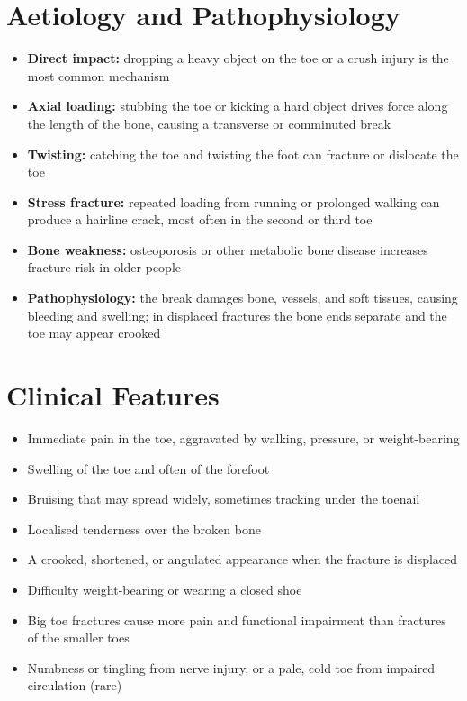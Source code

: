 \section*{Aetiology and Pathophysiology}
\begin{itemize}
    \item \textbf{Direct impact:} dropping a heavy object on the toe or a crush injury is the most common mechanism
    \item \textbf{Axial loading:} stubbing the toe or kicking a hard object drives force along the length of the bone, causing a transverse or comminuted break
    \item \textbf{Twisting:} catching the toe and twisting the foot can fracture or dislocate the toe
    \item \textbf{Stress fracture:} repeated loading from running or prolonged walking can produce a hairline crack, most often in the second or third toe
    \item \textbf{Bone weakness:} osteoporosis or other metabolic bone disease increases fracture risk in older people
    \item \textbf{Pathophysiology:} the break damages bone, vessels, and soft tissues, causing bleeding and swelling; in displaced fractures the bone ends separate and the toe may appear crooked
\end{itemize}

\section*{Clinical Features}
\begin{itemize}
    \item Immediate pain in the toe, aggravated by walking, pressure, or weight-bearing
    \item Swelling of the toe and often of the forefoot
    \item Bruising that may spread widely, sometimes tracking under the toenail
    \item Localised tenderness over the broken bone
    \item A crooked, shortened, or angulated appearance when the fracture is displaced
    \item Difficulty weight-bearing or wearing a closed shoe
    \item Big toe fractures cause more pain and functional impairment than fractures of the smaller toes
    \item Numbness or tingling from nerve injury, or a pale, cold toe from impaired circulation (rare)
\end{itemize}

